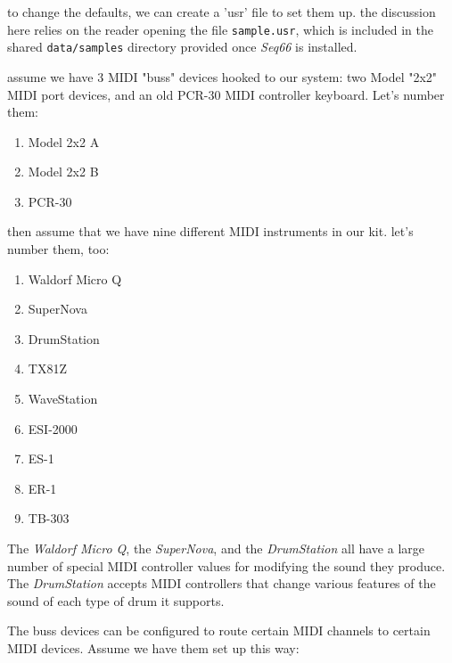    to change the defaults, we can create a 'usr' file to set them up.
   the discussion here relies on the reader opening the file
   \texttt{sample.usr}, which is included in the shared \texttt{data/samples}
   directory provided once \textsl{Seq66} is installed.

   assume we have 3 MIDI "buss" devices hooked to our system:
   two Model "2x2" MIDI port devices, and an old PCR-30 MIDI controller
   keyboard.  Let's number them:

   \begin{enumerate}
      \item Model 2x2 A
      \item Model 2x2 B
      \item PCR-30
   \end{enumerate}

   then assume that we have nine different MIDI instruments in our kit.
   let's number them, too:

   \begin{enumerate}
      \item Waldorf Micro Q
      \item SuperNova
      \item DrumStation
      \item TX81Z
      \item WaveStation
      \item ESI-2000
      \item ES-1
      \item ER-1
      \item TB-303
   \end{enumerate}

   The \textsl{Waldorf Micro Q},
   the \textsl{SuperNova},
   and the \textsl{DrumStation} all have a large
   number of special MIDI controller values for modifying the sound they
   produce.
   The \textsl{DrumStation} accepts MIDI controllers that change various
   features of the sound of each type of drum it supports.

   The buss devices can be configured to route certain
   MIDI channels to certain MIDI devices.  Assume we have them
   set up this way:

